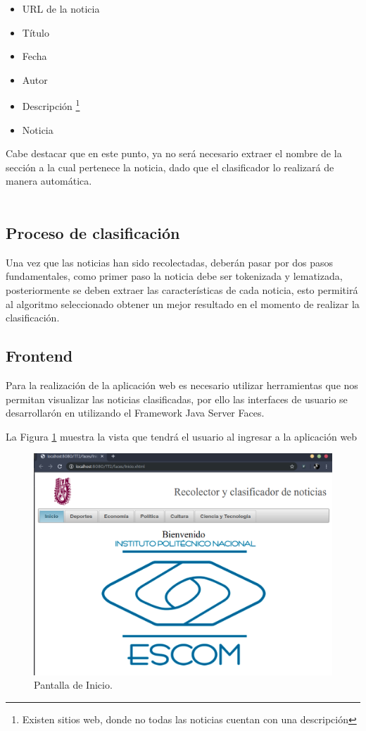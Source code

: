 \begin{itemize}
	\item URL de la noticia
	\item Título
	\item Fecha
	\item Autor
	\item Descripción \footnote{Existen sitios web, donde no todas las noticias cuentan con una descripción}
	\item Noticia
\end{itemize}

Cabe destacar que en este punto, ya no será necesario extraer el nombre de la sección a la cual pertenece la noticia, dado que el clasificador lo realizará de manera automática.
\\

\\
\subsection{Proceso de clasificación}
Una vez que las noticias han sido recolectadas, deberán pasar por dos pasos fundamentales, como primer paso la noticia debe ser tokenizada y lematizada, posteriormente se deben extraer las características de cada noticia, esto permitirá al algoritmo seleccionado obtener un mejor resultado en el momento de realizar la clasificación.

\subsection{Frontend}

Para la realización de la aplicación web es necesario utilizar herramientas que nos permitan visualizar las noticias clasificadas, por ello las interfaces de usuario se desarrollarón en utilizando el Framework Java Server Faces.

La Figura \ref{fig:PantallaInicio} muestra la vista que tendrá el usuario al ingresar a la aplicación web

\begin{figure}[ht]
\centering
\includegraphics[scale=0.3]{imagenes/Capitulo5/inicio.png}
\caption{Pantalla de Inicio.}
\label{fig:PantallaInicio}
\end{figure}

